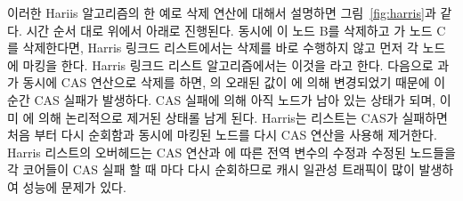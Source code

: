 이러한 Hariis 알고리즘의 한 예로 삭제 연산에 대해서 설명하면 그림~\ref{fig:harris}과 같다. 
시간 순서 대로 위에서 아래로 진행된다.
동시에 이 노드 B를 삭제하고 가 노드 C를 삭제한다면,
Harris 링크드 리스트에서는 삭제를 바로 수행하지 않고 먼저 각 노드에 마킹을 한다. 
Harris 링크드 리스트 알고리즘에서는 이것을 라고 한다.
다음으로 과 가 동시에 CAS 연산으로 삭제를 하면, 의 오래된 값이 
에 의해 변경되었기 때문에 이 순간 CAS 실패가 발생하다. 
CAS 실패에 의해 아직 노드가 남아 있는 상태가 되며, 이미 에 의해 
논리적으로 제거된 상태롤 남게 된다.  
Harris는 리스트는 CAS가 실패하면 처음 부터 다시 순회함과 동시에 마킹된 노드를 다시 CAS 연산을 사용해 
제거한다.
Harris 리스트의 오버헤드는 CAS 연산과 에 따른 전역 변수의 수정과 
수정된 노드들을 각 코어들이 CAS 실패 할 때 마다 다시 순회하므로 캐시 일관성 트래픽이 
많이 발생하여 성능에 문제가 있다.



